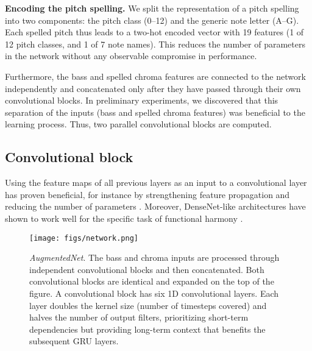 \textbf{Encoding the pitch spelling.}
We split the representation of a pitch spelling into two components: the pitch class (0--12) and the generic note letter (A--G).
Each spelled pitch thus leads to a two-hot encoded vector with 19 features (1 of 12 pitch classes, and 1 of 7 note names).
This reduces the number of parameters in the network without any observable compromise in performance.

Furthermore, the bass and spelled chroma features are connected to the network independently and concatenated only after they have passed through their own convolutional blocks. 
In preliminary experiments, we discovered that this separation of the inputs (bass and spelled chroma features) was beneficial to the learning process.
Thus, two parallel convolutional blocks are computed.

\subsection{Convolutional block}

Using the feature maps of all previous layers as an input to a convolutional layer has proven beneficial, for instance by strengthening feature propagation and reducing the number of parameters \cite{huang_densely_2017}. 
Moreover, DenseNet-like architectures have shown to work well for the specific task of functional harmony \cite{micchi_not_2020}.

\begin{figure*}
 \centerline{
 \texttt{[image: figs/network.png]}}
 \caption{\emph{AugmentedNet}. The bass and chroma inputs are processed through independent convolutional blocks and then concatenated. Both convolutional blocks are identical and expanded on the top of the figure. A convolutional block has six 1D convolutional layers. Each layer doubles the kernel size (number of timesteps covered) and halves the number of output filters, prioritizing short-term dependencies but providing long-term context that benefits the subsequent GRU layers.}
 \label{fig:network}
\end{figure*}

